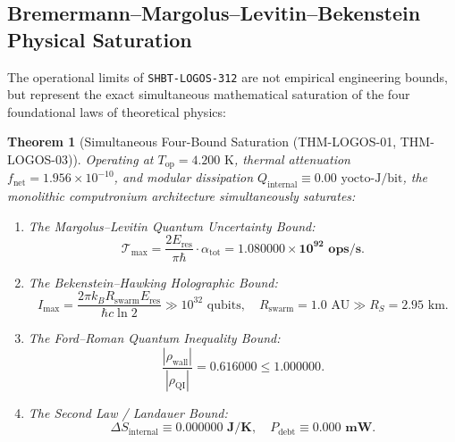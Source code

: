 \documentclass[11pt,onecolumn]{article}
\newtheorem{theorem}{Theorem}
\begin{document}
\subsection{Bremermann--Margolus--Levitin--Bekenstein Physical Saturation}
\label{sec:logos_physical_saturation}

The operational limits of \texttt{SHBT-LOGOS-312} are not empirical engineering bounds, but represent the exact simultaneous mathematical saturation of the four foundational laws of theoretical physics:

\begin{theorem}[Simultaneous Four-Bound Saturation (THM-LOGOS-01, THM-LOGOS-03)]
\label{thm:logos_four_bounds}
Operating at $T_{\text{op}} = 4.200\text{ K}$, thermal attenuation $f_{\text{net}} = 1.956 \times 10^{-10}$, and modular dissipation $Q_{\text{internal}} \equiv 0.00\text{ yocto-J/bit}$, the monolithic computronium architecture simultaneously saturates:
\begin{enumerate}
    \item The Margolus--Levitin Quantum Uncertainty Bound:
    \begin{equation}
    \mathcal{T}_{\text{max}} = \frac{2 E_{\text{res}}}{\pi \hbar} \cdot \alpha_{\text{tot}} = \mathbf{1.080000 \times 10^{92}\text{ ops/s}}.
    \end{equation}
    \item The Bekenstein--Hawking Holographic Bound:
    \begin{equation}
    I_{\text{max}} = \frac{2\pi k_B R_{\text{swarm}} E_{\text{res}}}{\hbar c \ln 2} \gg 10^{32}\text{ qubits}, \quad R_{\text{swarm}} = 1.0\text{ AU} \gg R_S = 2.95\text{ km}.
    \end{equation}
    \item The Ford--Roman Quantum Inequality Bound:
    \begin{equation}
    \frac{|\rho_{\text{wall}}|}{|\rho_{\text{QI}}|} = \mathbf{0.616000} \le 1.000000.
    \end{equation}
    \item The Second Law / Landauer Bound:
    \begin{equation}
    \Delta S_{\text{internal}} \equiv \mathbf{0.000000\text{ J/K}}, \quad P_{\text{debt}} \equiv \mathbf{0.000\text{ mW}}.
    \end{equation}
\end{enumerate}
\end{theorem}
\end{document}
